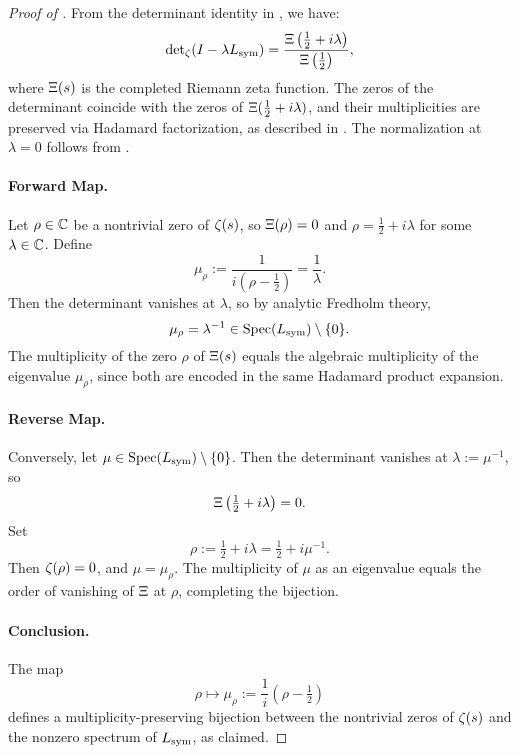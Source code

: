 \begin{proof}[Proof of ]
From the determinant identity in , we have:
\[
\det\nolimits_\zeta(I - \lambda L_{\mathrm{sym}}) = \frac{\Xi\left( \tfrac{1}{2} + i\lambda \right)}{\Xi\left( \tfrac{1}{2} \right)},
\]
where \( \Xi(s) \) is the completed Riemann zeta function. The zeros of the determinant coincide with the zeros of \( \Xi(\tfrac{1}{2} + i\lambda) \), and their multiplicities are preserved via Hadamard factorization, as described in . The normalization at \( \lambda = 0 \) follows from .

\paragraph{Forward Map.}
Let \( \rho \in \mathbb{C} \) be a nontrivial zero of \( \zeta(s) \), so \( \Xi(\rho) = 0 \) and \( \rho = \tfrac{1}{2} + i\lambda \) for some \( \lambda \in \mathbb{C} \). Define
\[
\mu_\rho := \frac{1}{i(\rho - \tfrac{1}{2})} = \frac{1}{\lambda}.
\]
Then the determinant vanishes at \( \lambda \), so by analytic Fredholm theory,
\[
\mu_\rho = \lambda^{-1} \in \operatorname{Spec}(L_{\mathrm{sym}}) \setminus \{0\}.
\]
The multiplicity of the zero \( \rho \) of \( \Xi(s) \) equals the algebraic multiplicity of the eigenvalue \( \mu_\rho \), since both are encoded in the same Hadamard product expansion.

\paragraph{Reverse Map.}
Conversely, let \( \mu \in \operatorname{Spec}(L_{\mathrm{sym}}) \setminus \{0\} \). Then the determinant vanishes at \( \lambda := \mu^{-1} \), so
\[
\Xi\left(\tfrac{1}{2} + i\lambda\right) = 0.
\]
Set
\[
\rho := \tfrac{1}{2} + i\lambda = \tfrac{1}{2} + i \mu^{-1}.
\]
Then \( \zeta(\rho) = 0 \), and \( \mu = \mu_\rho \). The multiplicity of \( \mu \) as an eigenvalue equals the order of vanishing of \( \Xi \) at \( \rho \), completing the bijection.

\paragraph{Conclusion.}
The map
\[
\rho \mapsto \mu_\rho := \frac{1}{i}(\rho - \tfrac{1}{2})
\]
defines a multiplicity-preserving bijection between the nontrivial zeros of \( \zeta(s) \) and the nonzero spectrum of \( L_{\mathrm{sym}} \), as claimed.
\end{proof}
